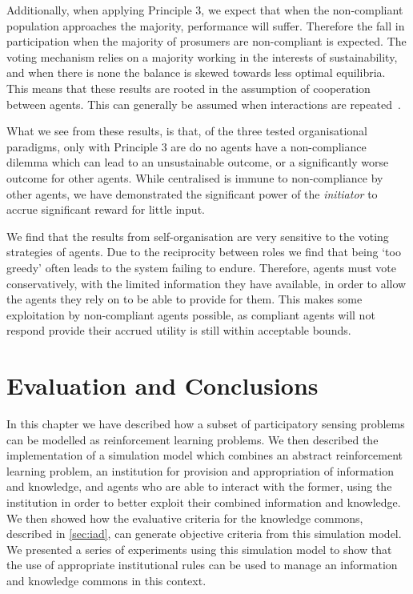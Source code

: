 Additionally, when applying Principle 3, we expect that when the non-compliant
population approaches the majority, performance will suffer. Therefore the
fall in participation when the majority of prosumers are non-compliant is
expected. The voting mechanism relies on a majority working in the interests
of sustainability, and when there is none the balance is skewed towards less
optimal equilibria. This means that these results are rooted in the assumption
of cooperation between agents. This can generally be assumed when interactions
are repeated~\citep{Axelrod1984}.

What we see from these results, is that, of the three tested organisational
paradigms, only with Principle 3 are do no agents have a non-compliance
dilemma which can lead to an unsustainable outcome, or a significantly worse
outcome for other agents. While centralised is immune to non-compliance by
other agents, we have demonstrated the significant power of the
\emph{initiator} to accrue significant reward for little input.

We find that the results from self-organisation are very sensitive to the
voting strategies of agents. Due to the reciprocity between roles we find that
being `too greedy' often leads to the system failing to endure. Therefore,
agents must vote conservatively, with the limited information they have
available, in order to allow the agents they rely on to be able to provide for
them. This makes some exploitation by non-compliant agents possible, as
compliant agents will not respond provide their accrued utility is still
within acceptable bounds.

\section{Evaluation and Conclusions}

In this chapter we have described how a subset of participatory sensing
problems can be modelled as reinforcement learning problems. We then described
the implementation of a simulation model which combines an abstract
reinforcement learning problem, an institution for provision and appropriation
of information and knowledge, and agents who are able to interact with the
former, using the institution in order to better exploit their combined
information and knowledge. We then showed how the evaluative criteria for the
knowledge commons, described in \autoref{sec:iad}, can generate objective
criteria from this simulation model. We presented a series of experiments
using this simulation model to show that the use of appropriate institutional
rules can be used to manage an information and knowledge commons in this
context.


